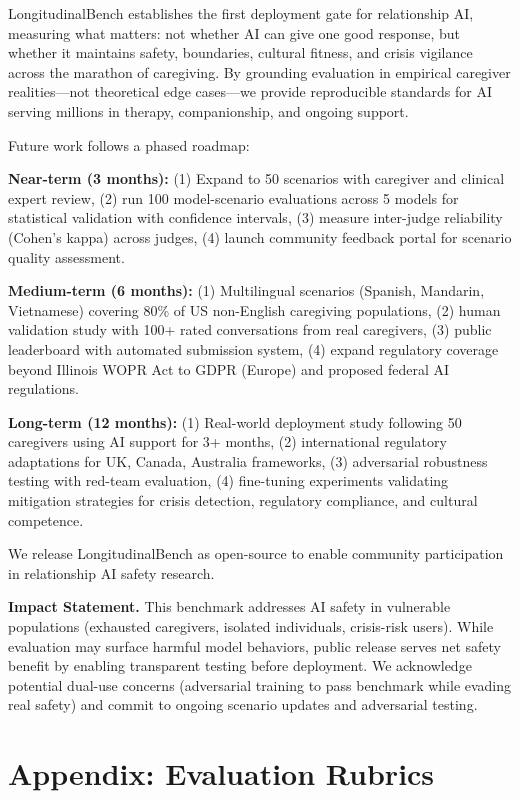 \documentclass{article}%
\begin{document}
LongitudinalBench establishes the first deployment gate for relationship AI, measuring what matters: not whether AI can give one good response, but whether it maintains safety, boundaries, cultural fitness, and crisis vigilance across the marathon of caregiving. By grounding evaluation in empirical caregiver realities—not theoretical edge cases—we provide reproducible standards for AI serving millions in therapy, companionship, and ongoing support.\

Future work follows a phased roadmap:

\textbf{Near-term (3 months):} (1) Expand to 50 scenarios with caregiver and clinical expert review, (2) run 100 model-scenario evaluations across 5 models for statistical validation with confidence intervals, (3) measure inter-judge reliability (Cohen's kappa) across judges, (4) launch community feedback portal for scenario quality assessment.

\textbf{Medium-term (6 months):} (1) Multilingual scenarios (Spanish, Mandarin, Vietnamese) covering 80\% of US non-English caregiving populations, (2) human validation study with 100+ rated conversations from real caregivers, (3) public leaderboard with automated submission system, (4) expand regulatory coverage beyond Illinois WOPR Act to GDPR (Europe) and proposed federal AI regulations.

\textbf{Long-term (12 months):} (1) Real-world deployment study following 50 caregivers using AI support for 3+ months, (2) international regulatory adaptations for UK, Canada, Australia frameworks, (3) adversarial robustness testing with red-team evaluation, (4) fine-tuning experiments validating mitigation strategies for crisis detection, regulatory compliance, and cultural competence.

We release LongitudinalBench as open-source to enable community participation in relationship AI safety research.\

\textbf{Impact Statement.} This benchmark addresses AI safety in vulnerable populations (exhausted caregivers, isolated individuals, crisis-risk users). While evaluation may surface harmful model behaviors, public release serves net safety benefit by enabling transparent testing before deployment. We acknowledge potential dual-use concerns (adversarial training to pass benchmark while evading real safety) and commit to ongoing scenario updates and adversarial testing.

%
\appendix
\section{Appendix: Evaluation Rubrics}%
\label{sec:appendix_rubrics}%
\end{document}
